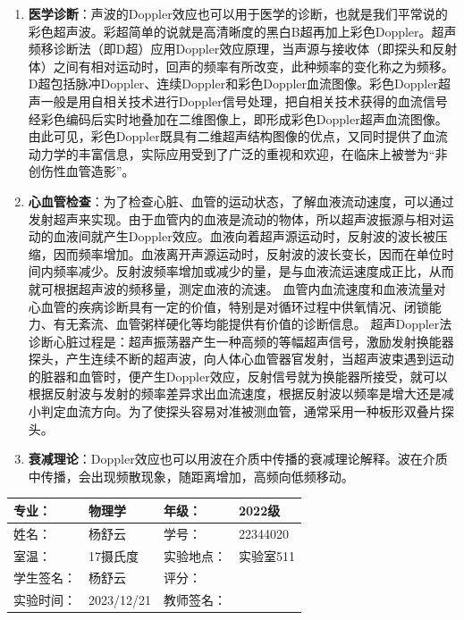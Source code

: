 \documentclass[dvipsnames, svgnames,a4paper,11pt]{article}
\begin{document}
\begin{enumerate}
		\item \textbf{医学诊断}：声波的Doppler效应也可以用于医学的诊断，也就是我们平常说的彩色超声波。彩超简单的说就是高清晰度的黑白B超再加上彩色Doppler。超声频移诊断法（即D超）应用Doppler效应原理，当声源与接收体（即探头和反射体）之间有相对运动时，回声的频率有所改变，此种频率的变化称之为频移。D超包括脉冲Doppler、连续Doppler和彩色Doppler血流图像。彩色Doppler超声一般是用自相关技术进行Doppler信号处理，把自相关技术获得的血流信号经彩色编码后实时地叠加在二维图像上，即形成彩色Doppler超声血流图像。由此可见，彩色Doppler既具有二维超声结构图像的优点，又同时提供了血流动力学的丰富信息，实际应用受到了广泛的重视和欢迎，在临床上被誉为“非创伤性血管造影”。
		
		\item \textbf{心血管检查}：为了检查心脏、血管的运动状态，了解血液流动速度，可以通过发射超声来实现。由于血管内的血液是流动的物体，所以超声波振源与相对运动的血液间就产生Doppler效应。血液向着超声源运动时，反射波的波长被压缩，因而频率增加。血液离开声源运动时，反射波的波长变长，因而在单位时间内频率减少。反射波频率增加或减少的量，是与血液流运速度成正比，从而就可根据超声波的频移量，测定血液的流速。
		血管内血流速度和血液流量对心血管的疾病诊断具有一定的价值，特别是对循环过程中供氧情况、闭锁能力、有无紊流、血管粥样硬化等均能提供有价值的诊断信息。
		超声Doppler法诊断心脏过程是：超声振荡器产生一种高频的等幅超声信号，激励发射换能器探头，产生连续不断的超声波，向人体心血管器官发射，当超声波束遇到运动的脏器和血管时，便产生Doppler效应，反射信号就为换能器所接受，就可以根据反射波与发射的频率差异求出血流速度，根据反射波以频率是增大还是减小判定血流方向。为了使探头容易对准被测血管，通常采用一种板形双叠片探头。
		
		\item \textbf{衰减理论}：Doppler效应也可以用波在介质中传播的衰减理论解释。波在介质中传播，会出现频散现象，随距离增加，高频向低频移动。
	\end{enumerate}
	
	
	
	
	\clearpage
	\begin{table}
		\renewcommand\arraystretch{1.7}
		\centering
		\begin{tabularx}{\textwidth}{|X|X|X|X|}
			\hline
			专业： & 物理学 & 年级： & 2022级 \\
			\hline
			姓名： & 杨舒云 & 学号： & 22344020\\
			\hline
			室温： & 17摄氏度 & 实验地点： & 实验室511 \\
			\hline
			学生签名：& 杨舒云 & 评分： &\\
			\hline
			实验时间：& 2023/12/21 & 教师签名：&\\
			\hline
		\end{tabularx}
	\end{table}
	
\end{document}
